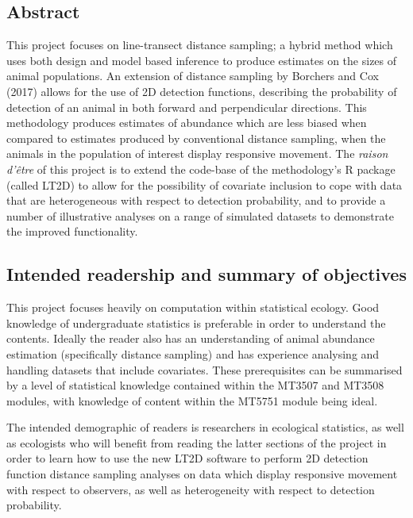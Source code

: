 \documentclass[11pt]{article}
\begin{document}
\tableofcontents
{}
\newpage
\begin{multicols}{2}

\newpage

\section{Abstract}
This project focuses on line-transect distance sampling; a hybrid method which uses both design and model based inference to produce estimates on the sizes of animal populations. An extension of distance sampling by Borchers and Cox (2017) allows for the use of 2D detection functions, describing the probability of detection of an animal in both forward and perpendicular directions. This methodology produces estimates of abundance which are less biased when compared to estimates produced by conventional distance sampling, when the animals in the population of interest display responsive movement. The \textit{raison d'être} of this project is to extend the code-base of the \cite{Borchers} methodology's R package (called LT2D) to allow for the possibility of covariate inclusion to cope with data that are heterogeneous with respect to detection probability, and to provide a number of illustrative analyses on a range of simulated datasets to demonstrate the improved functionality.

\subsection{Intended readership and summary of objectives}
This project focuses heavily on computation within statistical ecology. Good knowledge of undergraduate statistics is preferable in order to understand the contents. Ideally the reader also has an understanding of animal abundance estimation (specifically distance sampling) and has experience analysing and handling datasets that include covariates. These prerequisites can be summarised by a level of statistical knowledge contained within the MT3507 and MT3508 modules, with knowledge of content within the MT5751 module being ideal.

The intended demographic of readers is researchers in ecological statistics, as well as ecologists who will benefit from reading the latter sections of the project in order to learn how to use the new LT2D software to perform 2D detection function distance sampling analyses on data which display responsive movement with respect to observers, as well as heterogeneity with respect to detection probability. 


\end{multicols}
\end{document}
